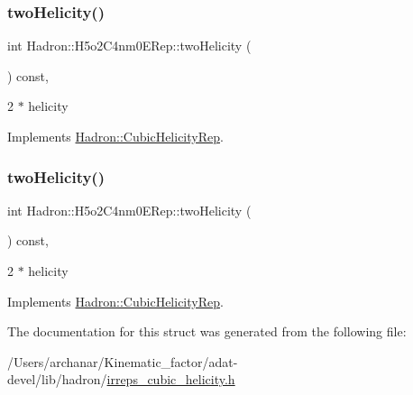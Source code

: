 \subsubsection{\texorpdfstring{twoHelicity()}{twoHelicity()}\hspace{0.1cm}{\footnotesize\ttfamily [2/3]}}
{\footnotesize\ttfamily int Hadron\+::\+H5o2\+C4nm0\+E\+Rep\+::two\+Helicity (\begin{DoxyParamCaption}{ }\end{DoxyParamCaption}) const\hspace{0.3cm}{\ttfamily [inline]}, {\ttfamily [virtual]}}

2 $\ast$ helicity 

Implements \mbox{\hyperlink{structHadron_1_1CubicHelicityRep_af507aa56fc2747eacc8cb6c96db31ecc}{Hadron\+::\+Cubic\+Helicity\+Rep}}.

\mbox{\label{structHadron_1_1H5o2C4nm0ERep_a3f459ff8e7a5af2e24b6bc9b86d70a87}} 
\subsubsection{\texorpdfstring{twoHelicity()}{twoHelicity()}\hspace{0.1cm}{\footnotesize\ttfamily [3/3]}}
{\footnotesize\ttfamily int Hadron\+::\+H5o2\+C4nm0\+E\+Rep\+::two\+Helicity (\begin{DoxyParamCaption}{ }\end{DoxyParamCaption}) const\hspace{0.3cm}{\ttfamily [inline]}, {\ttfamily [virtual]}}

2 $\ast$ helicity 

Implements \mbox{\hyperlink{structHadron_1_1CubicHelicityRep_af507aa56fc2747eacc8cb6c96db31ecc}{Hadron\+::\+Cubic\+Helicity\+Rep}}.



The documentation for this struct was generated from the following file\+:\begin{DoxyCompactItemize}
\item 
/\+Users/archanar/\+Kinematic\+\_\+factor/adat-\/devel/lib/hadron/\mbox{\hyperlink{adat-devel_2lib_2hadron_2irreps__cubic__helicity_8h}{irreps\+\_\+cubic\+\_\+helicity.\+h}}\end{DoxyCompactItemize}
